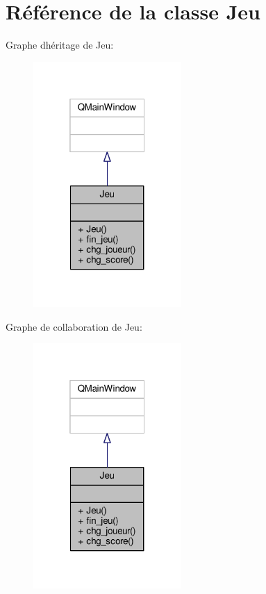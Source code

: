 \hypertarget{classJeu}{}\section{Référence de la classe Jeu}
\label{classJeu}


Graphe d\textquotesingle{}héritage de Jeu\+:
\nopagebreak
\begin{figure}[H]
\begin{center}
\leavevmode
\includegraphics[width=160pt]{classJeu__inherit__graph}
\end{center}
\end{figure}


Graphe de collaboration de Jeu\+:
\nopagebreak
\begin{figure}[H]
\begin{center}
\leavevmode
\includegraphics[width=160pt]{classJeu__coll__graph}
\end{center}
\end{figure}

